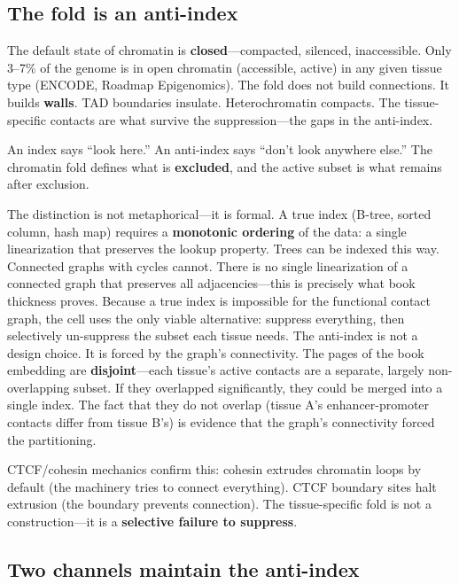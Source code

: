 \documentclass[11pt]{article}
\theoremstyle{definition}
\begin{document}
\subsection{The fold is an anti-index}

The default state of chromatin is \textbf{closed}---compacted, silenced, inaccessible. Only 3--7\% of the genome is in open chromatin (accessible, active) in any given tissue type (ENCODE, Roadmap Epigenomics). The fold does not build connections. It builds \textbf{walls}. TAD boundaries insulate. Heterochromatin compacts. The tissue-specific contacts are what survive the suppression---the gaps in the anti-index.

An index says ``look here.'' An anti-index says ``don't look anywhere else.'' The chromatin fold defines what is \textbf{excluded}, and the active subset is what remains after exclusion.

The distinction is not metaphorical---it is formal. A true index (B-tree, sorted column, hash map) requires a \textbf{monotonic ordering} of the data: a single linearization that preserves the lookup property. Trees can be indexed this way. Connected graphs with cycles cannot. There is no single linearization of a connected graph that preserves all adjacencies---this is precisely what book thickness proves. Because a true index is impossible for the functional contact graph, the cell uses the only viable alternative: suppress everything, then selectively un-suppress the subset each tissue needs. The anti-index is not a design choice. It is forced by the graph's connectivity. The pages of the book embedding are \textbf{disjoint}---each tissue's active contacts are a separate, largely non-overlapping subset. If they overlapped significantly, they could be merged into a single index. The fact that they do not overlap (tissue A's enhancer-promoter contacts differ from tissue B's) is evidence that the graph's connectivity forced the partitioning.

CTCF/cohesin mechanics confirm this: cohesin extrudes chromatin loops by default (the machinery tries to connect everything). CTCF boundary sites halt extrusion (the boundary prevents connection). The tissue-specific fold is not a construction---it is a \textbf{selective failure to suppress}.

\subsection{Two channels maintain the anti-index}
\end{document}
